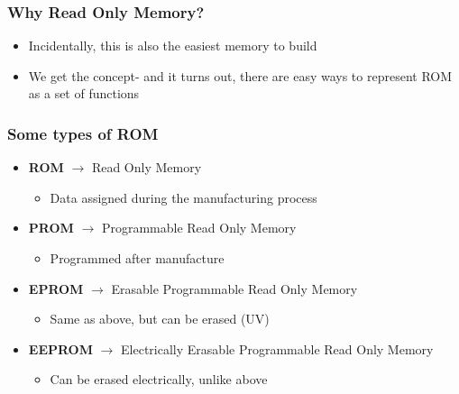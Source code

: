 \documentclass{beamer}
\begin{document}
             \begin{frame}
             	\frametitle{Why Read Only Memory?}
             	\begin{itemize}
             		\item Incidentally, this is also the easiest memory to build 
             		\item We get the concept- and it turns out, there are easy ways to represent ROM as a set of functions
             	\end{itemize}
             \end{frame}
             
             \begin{frame}
             	\frametitle{Some types of ROM}
             	\begin{itemize}
             		\item \textbf{ROM} $\rightarrow$ Read Only Memory
             		\begin{itemize}
             			\item Data assigned during the manufacturing process
             		\end{itemize}
             		\item \textbf{PROM} $\rightarrow$ Programmable Read Only Memory
             		\begin{itemize}
             			\item Programmed after manufacture
             		\end{itemize}
             		\item \textbf{EPROM} $\rightarrow$ Erasable Programmable Read Only Memory
             		\begin{itemize}
             			\item Same as above, but can be erased (UV)
             		\end{itemize}
             		\item \textbf{EEPROM} $\rightarrow$ Electrically Erasable Programmable Read Only Memory
             		\begin{itemize}
             			\item Can be erased electrically, unlike above
             		\end{itemize}
             		
         
             	\end{itemize}
             \end{frame}
             
\end{document}

